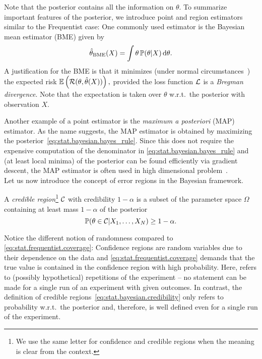 Note that the posterior contains all the information on $\theta$.
To summarize important features of the posterior, we introduce point and region estimators similar to the Frequentist case:
One commonly used estimator is the Bayesian mean estimator (BME) given by
\[
  \hat\theta_\mathrm{BME}(X) = \int \theta \, \mathbb{P}(\theta | X) \, \mathrm{d}\theta.
\]
A justification for the BME is that it minimizes (under normal circumstances~\cite{Lehmann_1998_Theory,Banerjee_2005_On}) the expected risk
\(
  \mathbb{E} \left( \mathcal{R}(\theta, \hat\theta(X)) \right),
\)
provided the loss function $\mathcal{L}$ is a \emph{Bregman divergence}.
Note that the expectation is taken over $\theta$ w.r.t.\ the posterior with observation $X$.

Another example of a point estimator is the \emph{maximum a posteriori} (MAP) estimator.
As the name suggests, the MAP estimator is obtained by maximizing the posterior~\eqref{eq:stat.bayesian.bayes_rule}.
Since this does not require the expensive computation of the denominator in \cref{eq:stat.bayesian.bayes_rule} and (at least local minima) of the posterior can be found efficiently via gradient descent, the MAP estimator is often used in high dimensional problem~\cite{Murphy_2012_Machine}.\\


Let us now introduce the concept of error regions in the Bayesian framework.
\begin{definition}
  \label{def:stat.bayesian.cr}
  A \emph{credible region}\footnote{%
    We use the same letter for confidence and credible regions when the meaning is clear from the context.
  }
  $\mathcal{C}$ with credibility $1-\alpha$ is a subset of the parameter space $\Omega$ containing at least mass $1-\alpha$ of the posterior
  \[
    \label{eq:stat.bayesian.credibility}
    \mathbb{P}(\theta \in \mathcal{C} | X_1, \ldots, X_N) \ge 1-\alpha.
  \]
\end{definition}
Notice the different notion of randomness compared to \cref{eq:stat.frequentist.coverage}:
Confidence regions are random variables due to their dependence on the data and \cref{eq:stat.frequentist.coverage} demands that the true value is contained in the confidence region with high probability.
Here,  refers to (possibly hypothetical) repetitions of the experiment -- no statement can be made for a single run of an experiment with given outcomes.
In contrast, the definition of credible regions~\eqref{eq:stat.bayesian.credibility} only refers to probability w.r.t.\ the posterior and, therefore, is well defined even for a single run of the experiment.

